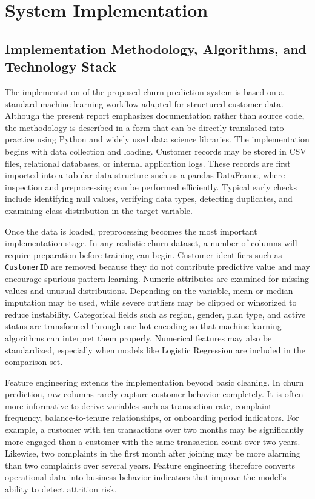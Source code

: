 \chapter{System Implementation}

\section{Implementation Methodology, Algorithms, and Technology Stack}
The implementation of the proposed churn prediction system is based on a standard machine learning workflow adapted for structured customer data. Although the present report emphasizes documentation rather than source code, the methodology is described in a form that can be directly translated into practice using Python and widely used data science libraries. The implementation begins with data collection and loading. Customer records may be stored in CSV files, relational databases, or internal application logs. These records are first imported into a tabular data structure such as a pandas DataFrame, where inspection and preprocessing can be performed efficiently. Typical early checks include identifying null values, verifying data types, detecting duplicates, and examining class distribution in the target variable.

Once the data is loaded, preprocessing becomes the most important implementation stage. In any realistic churn dataset, a number of columns will require preparation before training can begin. Customer identifiers such as \texttt{CustomerID} are removed because they do not contribute predictive value and may encourage spurious pattern learning. Numeric attributes are examined for missing values and unusual distributions. Depending on the variable, mean or median imputation may be used, while severe outliers may be clipped or winsorized to reduce instability. Categorical fields such as region, gender, plan type, and active status are transformed through one-hot encoding so that machine learning algorithms can interpret them properly. Numerical features may also be standardized, especially when models like Logistic Regression are included in the comparison set.

Feature engineering extends the implementation beyond basic cleaning. In churn prediction, raw columns rarely capture customer behavior completely. It is often more informative to derive variables such as transaction rate, complaint frequency, balance-to-tenure relationships, or onboarding period indicators. For example, a customer with ten transactions over two months may be significantly more engaged than a customer with the same transaction count over two years. Likewise, two complaints in the first month after joining may be more alarming than two complaints over several years. Feature engineering therefore converts operational data into business-behavior indicators that improve the model’s ability to detect attrition risk.

